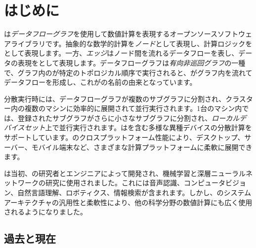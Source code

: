 \begin{savequote}[45mm]
\end{savequote}

\chapter{はじめに} 
\label{ch:introduction}

\begin{content}

\tf{}は\emph{データフローグラフ}を使用して数値計算を表現するオープンソースソフトウェアライブラリです。抽象的な数学的計算を\emph{ノード}として表現し、計算ロジックをとして表現します。一方、\emph{エッジ}はノード間を流れるデータフローを表し、データの表現をとして表現します。データフローグラフは\emph{有向非巡回グラフ}の一種で、グラフ内のが特定のトポロジカル順序で実行されると、がグラフ内を流れてデータフローを形成し、これが\tf{}の名前の由来となっています。

分散実行時には、データフローグラフが複数のサブグラフに分割され、クラスター内の複数のマシンに効率的に展開されて並行実行されます。1台のマシン内では、登録されたサブグラフがさらに小さなサブグラフに分割され、\emph{ローカルデバイスセット}上で並行実行されます。\tf{}はを含む多様な異種デバイスの分散計算をサポートしています。\tf{}のクロスプラットフォーム性能により、デスクトップ、サーバー、モバイル端末など、さまざまな計算プラットフォームに柔軟に展開できます。

\tf{}は当初、の研究者とエンジニアによって開発され、機械学習と深層ニューラルネットワークの研究に使用されました。これには音声認識、コンピュータビジョン、自然言語理解、ロボティクス、情報検索が含まれます。しかし、\tf{}のシステムアーキテクチャの汎用性と柔軟性により、他の科学分野の数値計算にも広く使用されるようになりました。

\end{content}

\section{過去と現在}

